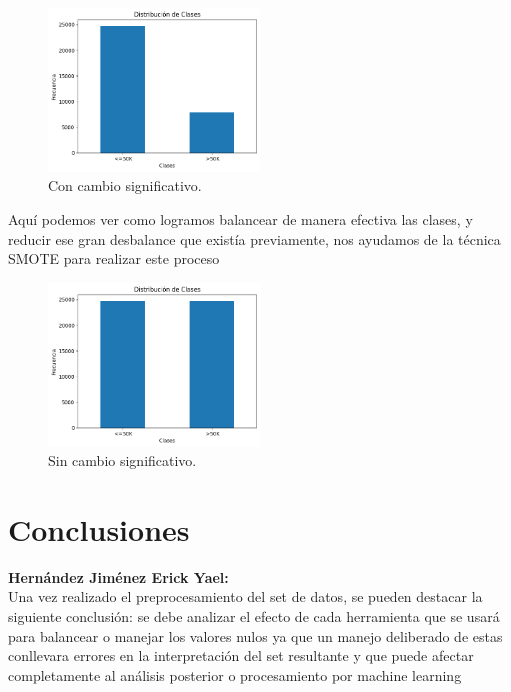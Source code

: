 \documentclass{article}
\begin{document}
    \begin{figure}[H] 
    	\centering
    	\includegraphics[width=0.5\textwidth]{output_1.png} 
    	\caption{Con cambio significativo.} 
    \end{figure}
    
    Aquí podemos ver como logramos balancear de manera efectiva las clases, y reducir ese gran desbalance que existía previamente, nos ayudamos de la técnica SMOTE para realizar este proceso
    
    \begin{figure}[H] 
    	\centering
    	\includegraphics[width=0.5\textwidth]{output_2.png} 
    	\caption{Sin cambio significativo.} 
    \end{figure}
    
    \section{Conclusiones} 
    
    \textbf{\Large Hernández Jiménez Erick Yael:} \\
    
    Una vez realizado el preprocesamiento del set de datos, se pueden destacar la siguiente conclusión: se debe analizar el efecto de cada herramienta que se usará para balancear o manejar los valores nulos ya que un manejo deliberado de estas conllevara errores en la interpretación del set resultante y que puede afectar completamente al análisis posterior o procesamiento por machine learning \\
    
\end{document}
